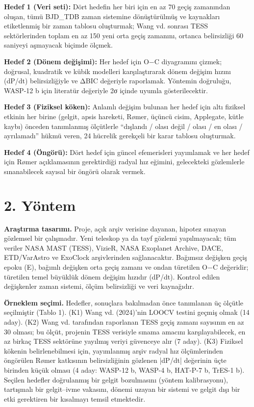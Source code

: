 \textbf{Hedef 1 (Veri seti):} Dört hedefin her biri için en az 70 geçiş zamanından oluşan, tümü BJD\_TDB zaman sistemine dönüştürülmüş ve kaynakları etiketlenmiş bir zaman tablosu oluşturmak; Wang vd. sonrası TESS sektörlerinden toplam en az 150 yeni orta geçiş zamanını, ortanca belirsizliği 60 saniyeyi aşmayacak biçimde ölçmek.

\textbf{Hedef 2 (Dönem değişimi):} Her hedef için O$-$C diyagramını çizmek; doğrusal, kuadratik ve kübik modelleri karşılaştırarak dönem değişim hızını (dP/dt) belirsizliğiyle ve ΔBIC değeriyle raporlamak. Yöntemin doğruluğu, WASP-12 b için literatür değeriyle 2σ içinde uyumla gösterilecektir.

\textbf{Hedef 3 (Fiziksel köken):} Anlamlı değişim bulunan her hedef için altı fiziksel etkinin her birine (gelgit, apsis hareketi, Rømer, üçüncü cisim, Applegate, kütle kaybı) önceden tanımlanmış ölçütlerle “dışlandı / olası değil / olası / en olası / ayrılamadı” hükmü veren, 24 hücrelik gerekçeli bir karar tablosu oluşturmak.

\textbf{Hedef 4 (Öngörü):} Dört hedef için güncel efemerisleri yayımlamak ve her hedef için Rømer açıklamasının gerektirdiği radyal hız eğimini, gelecekteki gözlemlerle sınanabilecek sayısal bir öngörü olarak vermek.

\section*{2. Yöntem}
\textbf{Araştırma tasarımı.} Proje, açık arşiv verisine dayanan, hipotez sınayan gözlemsel bir çalışmadır. Yeni teleskop ya da tayf gözlemi yapılmayacak; tüm veriler NASA MAST (TESS), VizieR, NASA Exoplanet Archive, DACE, ETD/VarAstro ve ExoClock arşivlerinden sağlanacaktır. Bağımsız değişken geçiş epoku (E), bağımlı değişken orta geçiş zamanı ve ondan türetilen O$-$C değeridir; türetilen temel büyüklük dönem değişim hızıdır (dP/dt). Kontrol edilen değişkenler zaman sistemi, ölçüm belirsizliği ve veri kaynağıdır.

\textbf{Örneklem seçimi.} Hedefler, sonuçlara bakılmadan önce tanımlanan üç ölçütle seçilmiştir (Tablo 1). (K1) Wang vd. (2024)'nin LOOCV testini geçmiş olmak (14 aday). (K2) Wang vd. tarafından raporlanan TESS geçiş zamanı sayısının en az 30 olması; bu ölçüt, projenin TESS verisiyle sınama amacını karşılayabilecek, en az birkaç TESS sektörüne yayılmış veriyi güvenceye alır (7 aday). (K3) Fiziksel kökenin belirlenebilmesi için, yayımlanmış arşiv radyal hız ölçümlerinden öngörülen Rømer katkısının belirsizliğinin gözlenen |dP/dt| değerinin üçte birinden küçük olması (4 aday: WASP-12 b, WASP-4 b, HAT-P-7 b, TrES-1 b). Seçilen hedefler doğrulanmış bir gelgit bozulmasını (yöntem kalibrasyonu), tartışmalı bir gelgit–ivme vakasını, dönemi uzayan bir sistemi ve gelgit dışı bir etki gerektiren bir kısalmayı temsil etmektedir.

